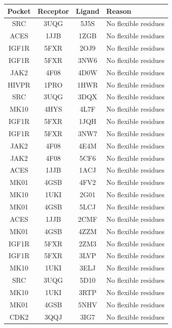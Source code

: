 \documentclass[journal=jcisd8,manuscript=article]{achemso}
\begin{document}
\begin{table}[]
    \centering
    \begin{tabular}{c c c l}
\toprule
Pocket & Receptor & Ligand & Reason \\
\midrule
SRC & 3UQG & 5J5S & No flexible residues \\
ACES & 1JJB & 1ZGB & No flexible residues \\
IGF1R & 5FXR & 2OJ9 & No flexible residues \\
IGF1R & 5FXR & 3NW6 & No flexible residues \\
JAK2 & 4F08 & 4D0W & No flexible residues \\
HIVPR & 1PRO & 1HWR & No flexible residues \\
SRC & 3UQG & 3DQX & No flexible residues \\
MK10 & 4HYS & 4L7F & No flexible residues \\
IGF1R & 5FXR & 1JQH & No flexible residues \\
IGF1R & 5FXR & 3NW7 & No flexible residues \\
JAK2 & 4F08 & 4E4M & No flexible residues \\
JAK2 & 4F08 & 5CF6 & No flexible residues \\
ACES & 1JJB & 1ACJ & No flexible residues \\
MK01 & 4GSB & 4FV2 & No flexible residues \\
MK10 & 1UKI & 2G01 & No flexible residues \\
MK01 & 4GSB & 5LCJ & No flexible residues \\
ACES & 1JJB & 2CMF & No flexible residues \\
MK01 & 4GSB & 4ZZM & No flexible residues \\
IGF1R & 5FXR & 2ZM3 & No flexible residues \\
IGF1R & 5FXR & 3LVP & No flexible residues \\
MK10 & 1UKI & 3ELJ & No flexible residues \\
SRC & 3UQG & 5D10 & No flexible residues \\
MK10 & 1UKI & 3RTP & No flexible residues \\
MK01 & 4GSB & 5NHV & No flexible residues \\
CDK2 & 3QQJ & 3IG7 & No flexible residues \\


\end{tabular}
\end{table}
\end{document}
